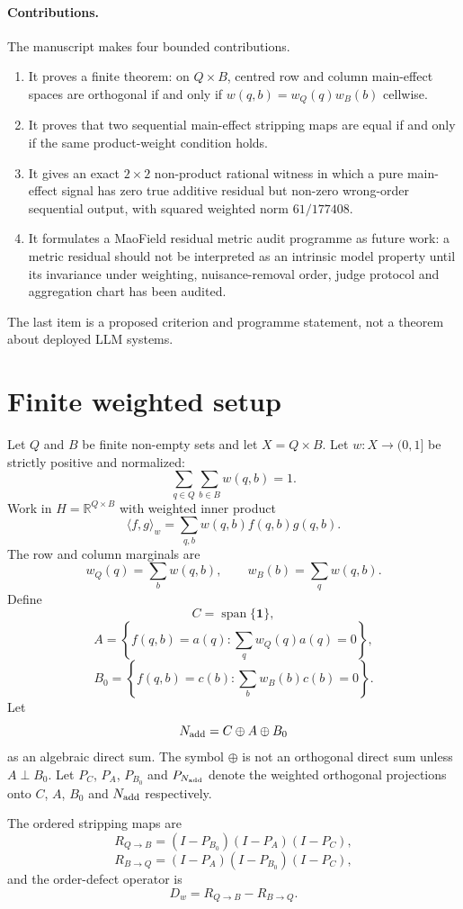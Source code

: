 \documentclass[11pt]{article}
\theoremstyle{remark}
\newcommand{\R}{\mathbb{R}}
\newcommand{\one}{\mathbf{1}}
\newcommand{\ip}[2]{\langle #1,#2\rangle_w}
\newcommand{\RQBt}{R_{Q\to B}}
\newcommand{\RBQt}{R_{B\to Q}}
\begin{document}
\paragraph{Contributions.}
The manuscript makes four bounded contributions.
\begin{enumerate}[leftmargin=*,itemsep=2pt]
\item It proves a finite theorem: on $Q\times B$, centred row and column main-effect spaces are orthogonal if and only if $w(q,b)=w_Q(q)w_B(b)$ cellwise.
\item It proves that two sequential main-effect stripping maps are equal if and only if the same product-weight condition holds.
\item It gives an exact $2\times2$ non-product rational witness in which a pure main-effect signal has zero true additive residual but non-zero wrong-order sequential output, with squared weighted norm $61/177408$.
\item It formulates a MaoField residual metric audit programme as future work: a metric residual should not be interpreted as an intrinsic model property until its invariance under weighting, nuisance-removal order, judge protocol and aggregation chart has been audited.
\end{enumerate}
The last item is a proposed criterion and programme statement, not a theorem about deployed LLM systems.

\section{Finite weighted setup}

Let $Q$ and $B$ be finite non-empty sets and let $X=Q\times B$. Let $w:X\to(0,1]$ be strictly positive and normalized:
\[
\sum_{q\in Q}\sum_{b\in B} w(q,b)=1.
\]
Work in $H=\R^{Q\times B}$ with weighted inner product
\[
\ip{f}{g}=\sum_{q,b} w(q,b)f(q,b)g(q,b).
\]
The row and column marginals are
\[
w_Q(q)=\sum_b w(q,b),\qquad w_B(b)=\sum_q w(q,b).
\]
Define
\[
C=\operatorname{span}\{\one\},
\]
\[
A=\left\{f(q,b)=a(q):\sum_q w_Q(q)a(q)=0\right\},
\]
\[
B_0=\left\{f(q,b)=c(b):\sum_b w_B(b)c(b)=0\right\}.
\]
Let
\[
N_{\rm add}=C\oplus A\oplus B_0
\]
as an algebraic direct sum. The symbol $\oplus$ is not an orthogonal direct sum unless $A\perp B_0$. Let $P_C$, $P_A$, $P_{B_0}$ and $P_{N_{\rm add}}$ denote the weighted orthogonal projections onto $C$, $A$, $B_0$ and $N_{\rm add}$ respectively.

The ordered stripping maps are
\[
\RQBt=(I-P_{B_0})(I-P_A)(I-P_C),
\]
\[
\RBQt=(I-P_A)(I-P_{B_0})(I-P_C),
\]
and the order-defect operator is
\[
D_w=\RQBt-\RBQt.
\]
\end{document}
